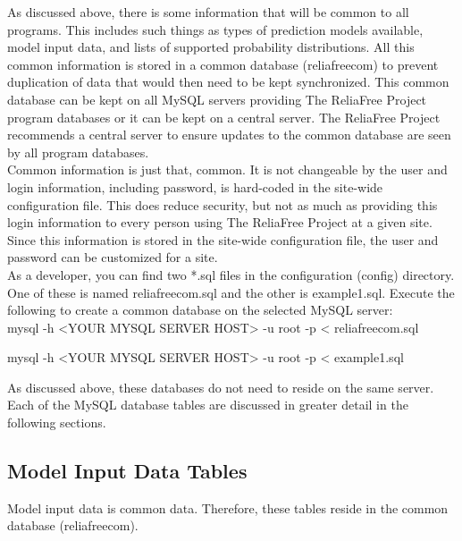 \documentclass[11pt, 12pt, twoside, onecolumn]{article}
\begin{document}
\noindent As discussed above, there is some information that will be common to all programs.  This includes such things as types of prediction models available, model input data, and lists of supported probability distributions.  All this common information is stored in a common database (reliafreecom) to prevent duplication of data that would then need to be kept synchronized.  This common database can be kept on all MySQL servers providing The ReliaFree Project program databases or it can be kept on a central server.  The ReliaFree Project recommends a central server to ensure updates to the common database are seen by all program databases. \\

\noindent Common information is just that, common.  It is not changeable by the user and login information, including password, is hard-coded in the site-wide configuration file.  This does reduce security, but not as much as providing this login information to every person using The ReliaFree Project at a given site.  Since this information is stored in the site-wide configuration file, the user and password can be customized for a site. \\

\noindent As a developer, you can find two *.sql files in the configuration (config) directory.  One of these is named reliafreecom.sql and the other is example1.sql.  Execute the following to create a common database on the selected MySQL server: \\

    mysql -h <YOUR MYSQL SERVER HOST> -u root -p < reliafreecom.sql

    mysql -h <YOUR MYSQL SERVER HOST> -u root -p < example1.sql

\bigskip \noindent As discussed above, these databases do not need to reside on the same server.  Each of the MySQL database tables are discussed in greater detail in the following sections.

\subsection{\bf \large Model Input Data Tables}

\noindent Model input data is common data.  Therefore, these tables reside in the common database (reliafreecom). \\
\end{document}
